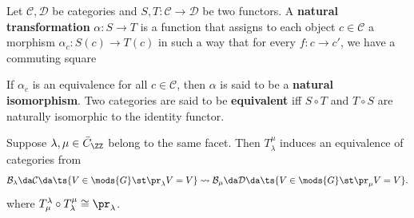 \begin{definition}

Let \(\mathcal{C}, \mathcal{D}\) be categories and
\(S, T:\mathcal{C} \to \mathcal{D}\) be two functors. A \textbf{natural
transformation} \(\alpha:S\to T\) is a function that assigns to each
object \(c\in \mathcal{C}\) a morphism \(\alpha_c:S(c) \to T(c)\) in
such a way that for every \(f:c\to c'\), we have a commuting square

\begin{center}
\end{center}

If \(\alpha_c\) is an equivalence for all \(c\in \mathcal{C}\), then
\(\alpha\) is said to be a \textbf{natural isomorphism}. Two categories
are said to be \textbf{equivalent} iff \(S\circ T\) and \(T\circ S\) are
naturally isomorphic to the identity functor.

\end{definition}

\begin{theorem}[?]

Suppose \(\lambda, \mu \in \bar{C}_\ZZ\) belong to the same facet. Then
\(T_\lambda^\mu\) induces an equivalence of categories from
\begin{align*}  
\mathcal{B}_\lambda \da \mathcal{C} \da \ts{V\in \mods{G} \st \pr_\lambda V = V} \leadsto
\mathcal{B}_\mu \da \mathcal{D} \da \ts{V\in \mods{G} \st \pr_\mu V = V}
.\end{align*} where
\(T_\mu^\lambda \circ T_\lambda^\mu \cong \pr_\lambda\).

\end{theorem}

